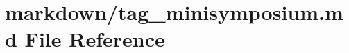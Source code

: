 \hypertarget{tag__minisymposium_8md}{}\section{markdown/tag\+\_\+minisymposium.md File Reference}
\label{tag__minisymposium_8md}
